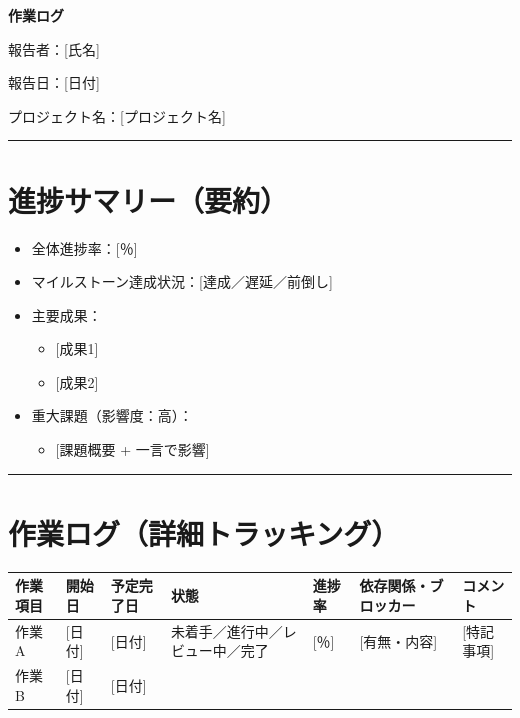 \documentclass[uplatex,dvipdfmx,a4paper,11pt]{jsarticle}
\newcommand{\sectionrule}{\par\medskip\noindent\rule{\linewidth}{0.6pt}\par\medskip}
\begin{document}
{\LARGE\bfseries 作業ログ}\par\bigskip

報告者：[氏名]

報告日：[日付]

プロジェクト名：[プロジェクト名]

\sectionrule

\section{進捗サマリー（要約）}

\begin{itemize}
  \item 全体進捗率：[％]
  \item マイルストーン達成状況：[達成／遅延／前倒し]
  \item 主要成果：
    \begin{itemize}
      \item {}[成果1]
      \item {}[成果2]
    \end{itemize}
  \item 重大課題（影響度：高）：
    \begin{itemize}
      \item {}[課題概要 + 一言で影響]
    \end{itemize}
\end{itemize}

\sectionrule

\section{作業ログ（詳細トラッキング）}

\begin{tabularx}{\linewidth}{@{}lllXlXX@{}}
\toprule
作業項目 & 開始日 & 予定完了日 & 状態 & 進捗率 & 依存関係・ブロッカー & コメント \\
\midrule
作業A & [日付] & [日付] & 未着手／進行中／レビュー中／完了 & [％] & [有無・内容] & [特記事項] \\
作業B & [日付] & [日付] &                                  &      &              &            \\
\bottomrule
\end{tabularx}
\end{document}
